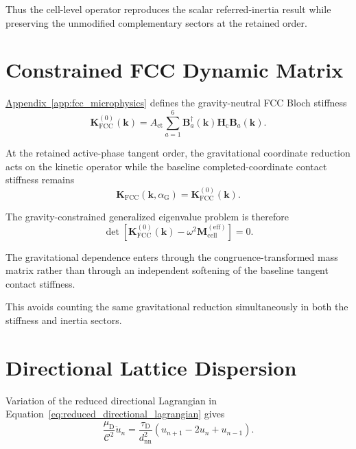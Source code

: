 Thus the cell-level operator reproduces the scalar referred-inertia result while preserving the unmodified complementary sectors at the retained order.

\section{Constrained FCC Dynamic Matrix}
\label{sec:grav_constrained_dynamic_matrix}

\hyperref[app:fcc_microphysics]{Appendix~\ref*{app:fcc_microphysics}} defines the gravity-neutral FCC Bloch stiffness
\begin{equation}
    \mathbf{K}_{\mathrm{FCC}}^{(0)}(\mathbf{k}) = A_{\mathrm{ct}} \sum_{a=1}^{6} \mathbf{B}_{a}^{\dagger}(\mathbf{k}) \mathbf{H}_{\mathrm{c}} \mathbf{B}_{a}(\mathbf{k}).
\end{equation}

At the retained active-phase tangent order, the gravitational coordinate reduction acts on the kinetic operator while the baseline completed-coordinate contact stiffness remains
\begin{equation}
    \mathbf{K}_{\mathrm{FCC}} \left( \mathbf{k}, \alpha_{\mathrm{G}} \right) = \mathbf{K}_{\mathrm{FCC}}^{(0)}(\mathbf{k}).
    \label{eq:baseline_stiffness_retained}
\end{equation}

The gravity-constrained generalized eigenvalue problem is therefore
\begin{equation}
    \det \left[ \mathbf{K}_{\mathrm{FCC}}^{(0)}(\mathbf{k}) - \omega^2 \mathbf{M}_{\mathrm{cell}}^{(\mathrm{eff})} \right] = 0.
    \label{eq:constrained_fcc_eigenproblem}
\end{equation}

The gravitational dependence enters through the congruence-transformed mass matrix rather than through an independent softening of the baseline tangent contact stiffness.

This avoids counting the same gravitational reduction simultaneously in both the stiffness and inertia sectors.

\section{Directional Lattice Dispersion}
\label{sec:grav_directional_dispersion}

Variation of the reduced directional Lagrangian in Equation~\eqref{eq:reduced_directional_lagrangian} gives
\begin{equation}
    \frac{\mu_{\mathrm{D}}}{\mathcal{C}^2} \ddot{u}_{n} = \frac{\tau_{\mathrm{D}}}{d_{\mathrm{nn}}^2} \left( u_{n+1}-2u_{n}+u_{n-1} \right).
    \label{eq:constrained_directional_equation}
\end{equation}

